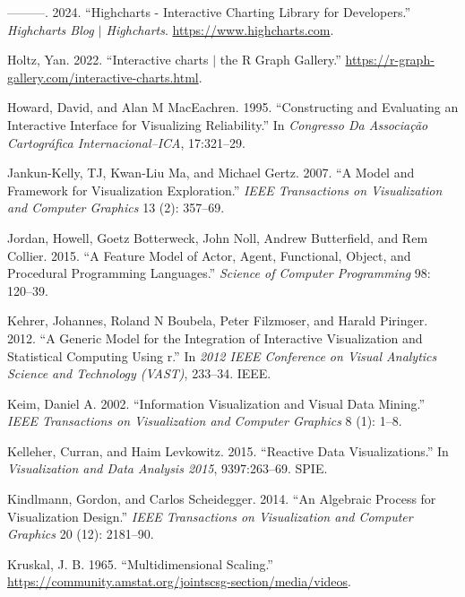 \documentclass[
]{book}
\newlength{\cslhangindent}
\newenvironment{CSLReferences}[2] %
 {\begin{list}{}{%
  \setlength{\itemindent}{0pt}
  \setlength{\leftmargin}{0pt}
  \setlength{\parsep}{0pt}
  \ifodd #1
   \setlength{\leftmargin}{\cslhangindent}
   \setlength{\itemindent}{-1\cslhangindent}
  \fi
  \setlength{\itemsep}{#2\baselineskip}}}
 {\end{list}}
\theoremstyle{definition}
\theoremstyle{definition}
\theoremstyle{definition}
\theoremstyle{definition}
\theoremstyle{remark}
\begin{document}
\begin{CSLReferences}{1}{0}
---------. 2024. {``Highcharts - Interactive Charting Library for Developers.''} \emph{Highcharts Blog {\(\vert\)} Highcharts}. \url{https://www.highcharts.com}.

Holtz, Yan. 2022. {``{Interactive charts {\(\vert\)} the R Graph Gallery}.''} \url{https://r-graph-gallery.com/interactive-charts.html}.

Howard, David, and Alan M MacEachren. 1995. {``Constructing and Evaluating an Interactive Interface for Visualizing Reliability.''} In \emph{Congresso Da Associa{ç}{ã}o Cartogr{á}fica Internacional--ICA}, 17:321--29.

Jankun-Kelly, TJ, Kwan-Liu Ma, and Michael Gertz. 2007. {``A Model and Framework for Visualization Exploration.''} \emph{IEEE Transactions on Visualization and Computer Graphics} 13 (2): 357--69.

Jordan, Howell, Goetz Botterweck, John Noll, Andrew Butterfield, and Rem Collier. 2015. {``A Feature Model of Actor, Agent, Functional, Object, and Procedural Programming Languages.''} \emph{Science of Computer Programming} 98: 120--39.

Kehrer, Johannes, Roland N Boubela, Peter Filzmoser, and Harald Piringer. 2012. {``A Generic Model for the Integration of Interactive Visualization and Statistical Computing Using r.''} In \emph{2012 IEEE Conference on Visual Analytics Science and Technology (VAST)}, 233--34. IEEE.

Keim, Daniel A. 2002. {``Information Visualization and Visual Data Mining.''} \emph{IEEE Transactions on Visualization and Computer Graphics} 8 (1): 1--8.

Kelleher, Curran, and Haim Levkowitz. 2015. {``Reactive Data Visualizations.''} In \emph{Visualization and Data Analysis 2015}, 9397:263--69. SPIE.

Kindlmann, Gordon, and Carlos Scheidegger. 2014. {``An Algebraic Process for Visualization Design.''} \emph{IEEE Transactions on Visualization and Computer Graphics} 20 (12): 2181--90.

Kruskal, J. B. 1965. {``{Multidimensional Scaling}.''} \url{https://community.amstat.org/jointscsg-section/media/videos}.


\end{CSLReferences}
\end{document}

